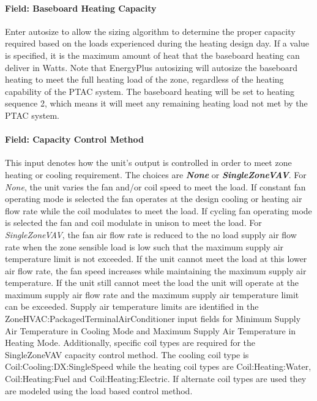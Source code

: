 \paragraph{Field: Baseboard Heating Capacity}\label{field-baseboard-heating-capacity-2}

Enter autosize to allow the sizing algorithm to determine the proper capacity required based on the loads experienced during the heating design day. If a value is specified, it is the maximum amount of heat that the baseboard heating can deliver in Watts. Note that EnergyPlus autosizing will autosize the baseboard heating to meet the full heating load of the zone, regardless of the heating capability of the PTAC system. The baseboard heating will be set to heating sequence 2, which means it will meet any remaining heating load not met by the PTAC system.

\paragraph{Field: Capacity Control Method}\label{field-capacity-control-method-2}

This input denotes how the unit's output is controlled in order to meet zone heating or cooling requirement. The choices are \textbf{\emph{None}} or \textbf{\emph{SingleZoneVAV}}. For \emph{None}, the unit varies the fan and/or coil speed to meet the load. If constant fan operating mode is selected the fan operates at the design cooling or heating air flow rate while the coil modulates to meet the load. If cycling fan operating mode is selected the fan and coil modulate in unison to meet the load. For \emph{SingleZoneVAV}, the fan air flow rate is reduced to the no load supply air flow rate when the zone sensible load is low such that the maximum supply air temperature limit is not exceeded. If the unit cannot meet the load at this lower air flow rate, the fan speed increases while maintaining the maximum supply air temperature. If the unit still cannot meet the load the unit will operate at the maximum supply air flow rate and the maximum supply air temperature limit can be exceeded. Supply air temperature limits are identified in the ZoneHVAC:PackagedTerminalAirConditioner input fields for Minimum Supply Air Temperature in Cooling Mode and Maximum Supply Air Temperature in Heating Mode. Additionally, specific coil types are required for the SingleZoneVAV capacity control method. The cooling coil type is Coil:Cooling:DX:SingleSpeed while the heating coil types are Coil:Heating:Water, Coil:Heating:Fuel and Coil:Heating:Electric. If alternate coil types are used they are modeled using the load based control method. 


